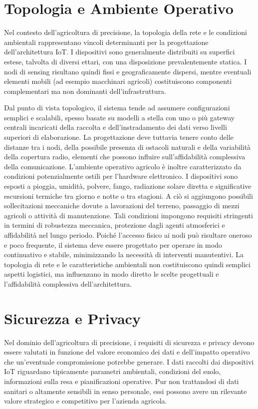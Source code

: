 \section{Topologia e Ambiente Operativo}

Nel contesto dell’agricoltura di precisione, la topologia della rete e le condizioni ambientali rappresentano vincoli determinanti per la progettazione dell’architettura IoT. I dispositivi sono generalmente distribuiti su superfici estese, talvolta di diversi ettari, con una disposizione prevalentemente statica. I nodi di sensing risultano quindi fissi e geograficamente dispersi, mentre eventuali elementi mobili (ad esempio macchinari agricoli) costituiscono componenti complementari ma non dominanti dell’infrastruttura.

Dal punto di vista topologico, il sistema tende ad assumere configurazioni semplici e scalabili, spesso basate su modelli a stella con uno o più gateway centrali incaricati della raccolta e dell’instradamento dei dati verso livelli superiori di elaborazione. La progettazione deve tuttavia tenere conto delle distanze tra i nodi, della possibile presenza di ostacoli naturali e della variabilità della copertura radio, elementi che possono influire sull’affidabilità complessiva della comunicazione. L’ambiente operativo agricolo è inoltre caratterizzato da condizioni potenzialmente ostili per l’hardware elettronico. I dispositivi sono esposti a pioggia, umidità, polvere, fango, radiazione solare diretta e significative escursioni termiche tra giorno e notte o tra stagioni. A ciò si aggiungono possibili sollecitazioni meccaniche dovute a lavorazioni del terreno, passaggio di mezzi agricoli o attività di manutenzione. Tali condizioni impongono requisiti stringenti in termini di robustezza meccanica, protezione dagli agenti atmosferici e affidabilità nel lungo periodo. Poiché l’accesso fisico ai nodi può risultare oneroso e poco frequente, il sistema deve essere progettato per operare in modo continuativo e stabile, minimizzando la necessità di interventi manutentivi. La topologia di rete e le caratteristiche ambientali non costituiscono quindi semplici aspetti logistici, ma influenzano in modo diretto le scelte progettuali e l’affidabilità complessiva dell’architettura.

\section{Sicurezza e Privacy}

Nel dominio dell’agricoltura di precisione, i requisiti di sicurezza e privacy devono essere valutati in funzione del valore economico dei dati e dell’impatto operativo che un’eventuale compromissione potrebbe generare. I dati raccolti dai dispositivi IoT riguardano tipicamente parametri ambientali, condizioni del suolo, informazioni sulla resa e pianificazioni operative. Pur non trattandosi di dati sanitari o altamente sensibili in senso personale, essi possono avere un rilevante valore strategico e competitivo per l’azienda agricola.

